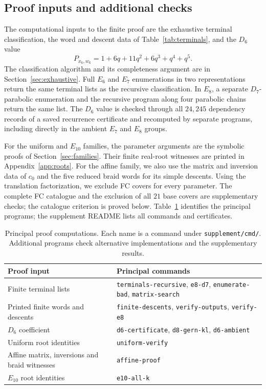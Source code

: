 \documentclass[10pt]{article}
\theoremstyle{remark}
\begin{document}
\subsection{Proof inputs and additional checks}
The computational inputs to the finite proof are the exhaustive terminal
classification, the word and descent data of Table~\ref{tab:terminals},
and the $D_6$ value
\[
 P_{x_6,w_6}=1+6q+11q^2+6q^3+q^4+q^5.
\]
The classification algorithm and its completeness argument are in
Section~\ref{sec:exhaustive}. Full $E_6$ and $E_7$ enumerations in two
representations return the same terminal lists as the recursive
classification. In $E_8$, a separate $D_7$-parabolic enumeration and the
recursive program along four parabolic chains return the same list.
The $D_6$ value is checked through all $24{,}245$ dependency records of
a saved recurrence certificate and recomputed by separate programs,
including directly in the ambient $E_7$ and $E_8$ groups.

For the uniform and $E_{10}$ families, the parameter arguments are the
symbolic proofs of Section~\ref{sec:families}. Their finite real-root
witnesses are printed in Appendix~\ref{app:roots}. For the affine family,
we also use the matrix and inversion data of $c_0$ and the five reduced
braid words for its simple descents. Using the translation factorization,
we exclude FC covers for every parameter. The complete FC catalogue and
the exclusion of all $21$ base covers are supplementary checks; the
catalogue criterion is proved below. Table~\ref{tab:programs}
identifies the principal programs; the supplement README lists all
commands and certificates.

\begin{table}[htbp]
\centering\small
\begin{tabular}{@{}>{\raggedright\arraybackslash}p{}>{\raggedright\arraybackslash}p{}@{}}
\toprule
Proof input & Principal commands\\
\midrule
Finite terminal lists & \texttt{terminals-recursive}, \texttt{e8-d7},
\texttt{enumerate-bad}, \texttt{matrix-search}\\
Printed finite words and descents & \texttt{finite-descents},
\texttt{verify-outputs}, \texttt{verify-e8}\\
$D_6$ coefficient & \texttt{d6-certificate}, \texttt{d8-gern-kl},
\texttt{d6-ambient}\\
Uniform root identities & \texttt{uniform-verify}\\
Affine matrix, inversions and braid witnesses & \texttt{affine-proof}\\
$E_{10}$ root identities & \texttt{e10-all-k}\\
\bottomrule
\end{tabular}
\caption{Principal proof computations. Each name is a command under
\texttt{supplement/cmd/}. Additional programs check alternative
implementations and the supplementary results.}
\label{tab:programs}
\end{table}
\end{document}
